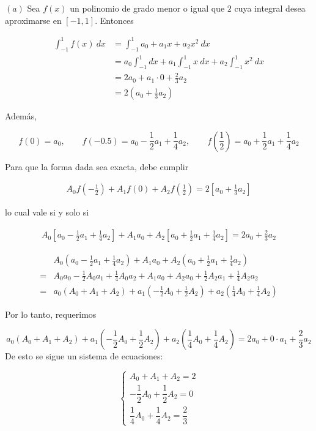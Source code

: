 \documentclass[12pt]{article}
\begin{document}
$(a)$ Sea $f(x)$ un polinomio de grado menor o igual que $2$ cuya integral desea
aproximarse en $[-1, 1]$. Entonces 

\begin{align*}
\int_{-1}^1 f(x) ~ dx 
&= \int_{-1}^1 a_0 + a_1x + a_2x^2 ~ dx\\  
&= a_0 \int_{-1}^1 dx + a_1 \int_{-1}^1 x ~ dx + a_2 \int_{-1}^1 x^2 ~ dx \\ 
&= 2a_0 + a_1 \cdot 0 + \frac{2}{3}a_2 \\ 
&=2 (a_0 + \frac{1}{3}a_2)
\end{align*}

Además, 

\begin{equation*}
    f(0) = a_0, \qquad f(-0.5) = a_0 - \frac{1}{2}a_1 + \frac{1}{4} a_2, \qquad
    f(\frac{1}{2}) = a_0 + \frac{1}{2}a_1 + \frac{1}{4} a_2
\end{equation*}

Para que la forma dada sea exacta, debe cumplir

\begin{align*}
    A_0 f\left( -\frac{1}{2} \right) + A_1 f(0) + A_2 f\left( \frac{1}{2}
    \right) = 2\left[ a_0 + \frac{1}{3} a_2 \right] 
\end{align*}

lo cual vale si y solo si 

\begin{align*}
    A_0 \left[ a_0 - \frac{1}{2}a_1 + \frac{1}{4}a_2 \right] + A_1 a_0 + A_2
    \left[ a_0 + \frac{1}{2} a_1 + \frac{1}{4}a_2 \right] = 2a_0 + \frac{2}{3}a_2
\end{align*}

\begin{align*}
&A_0\left(a_0-\frac12a_1+\frac14a_2\right)
+
A_1a_0
+
A_2\left(a_0+\frac12a_1+\frac14a_2\right)
\\[6pt]
={}&
A_0a_0-\frac12A_0a_1+\frac14A_0a_2
+
A_1a_0
+
A_2a_0+\frac12A_2a_1+\frac14A_2a_2
\\[6pt]
={}&
a_0(A_0+A_1+A_2)
+
a_1\left(-\frac12A_0+\frac12A_2\right)
+
a_2\left(\frac14A_0+\frac14A_2\right)
\end{align*}

Por lo tanto, requerimos

\[
a_0(A_0+A_1+A_2)
+
a_1\left(-\frac12A_0+\frac12A_2\right)
+
a_2\left(\frac14A_0+\frac14A_2\right)
=
2a_0+0\cdot a_1+\frac23a_2
\]
De esto se sigue un sistema de ecuaciones:

\[
\begin{cases}
A_0+A_1+A_2=2\\[4pt]
-\dfrac12A_0+\dfrac12A_2=0\\[6pt]
\dfrac14A_0+\dfrac14A_2=\dfrac23
\end{cases}
\]
\end{document}
